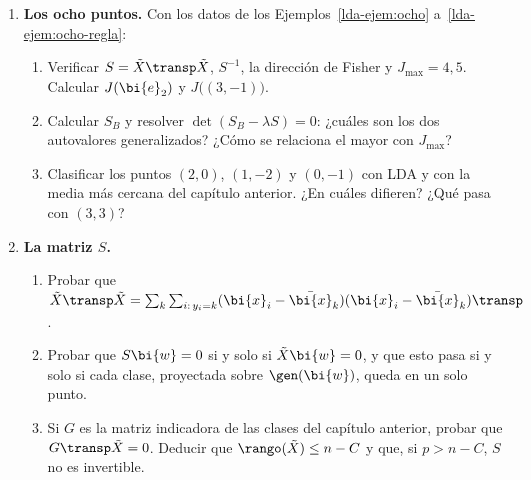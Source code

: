 \begin{enumerate}[leftmargin=*,label=\textbf{\thechapter.\arabic*},ref=\thechapter.\arabic*,itemsep=4pt]
\item {} \textbf{Los ocho puntos.}\label{lda-ej:ocho} Con los datos
de los Ejemplos~\ref{lda-ejem:ocho} a~\ref{lda-ejem:ocho-regla}:
\begin{enumerate}[label=(\alph*)]
\item Verificar $S=\tilde X\transp \tilde X$, $S^{-1}$, la dirección de Fisher y
$J_{\max}=4{,}5$. Calcular $J(\bi{e}_2)$ y $J\bigl((3,-1)\bigr)$.
\item Calcular $S_B$ y resolver $\det(S_B-\lambda S)=0$: ¿cuáles son los dos
autovalores generalizados? ¿Cómo se relaciona el mayor con $J_{\max}$?
\item Clasificar los puntos $(2,0)$, $(1,-2)$ y $(0,-1)$ con LDA y con la media
más cercana del capítulo anterior. ¿En cuáles difieren? ¿Qué pasa con $(3,3)$?
\end{enumerate}

\item {} \textbf{La matriz $S$.}\label{lda-ej:SW}
\begin{enumerate}[label=(\alph*)]
\item Probar que $\tilde X\transp \tilde X=\sum_k\sum_{i:\,y_i=k}(\bi{x}_i-\bar{\bi{x}}_k)(\bi{x}_i-\bar{\bi{x}}_k)\transp$.
\item Probar que $S\bi{w}=0$ si y solo si $\tilde X\bi{w}=0$, y que esto pasa si y solo si
cada clase, proyectada sobre $\gen(\bi{w})$, queda en un solo punto.
\item Si $G$ es la matriz indicadora de las clases del capítulo anterior,
probar que $G\transp \tilde X=0$. Deducir que $\rango(\tilde X)\le n-C$ y que, si
$p>n-C$, $S$ no es invertible.
\end{enumerate}


\end{enumerate}
